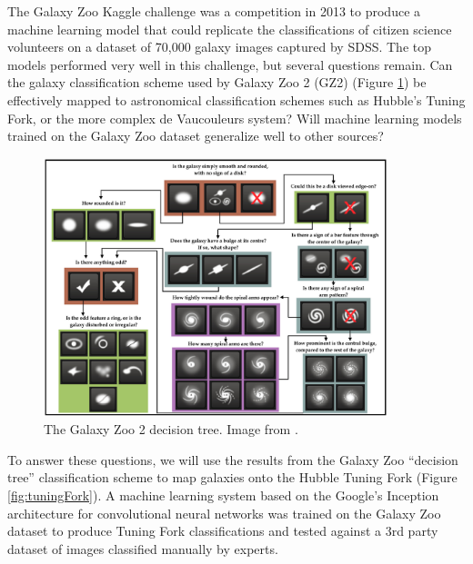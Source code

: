 \documentclass{article}
\begin{document}
The Galaxy Zoo Kaggle challenge was a competition in 2013 to produce a machine learning model that could replicate the classifications of citizen science volunteers on a dataset of 70,000 galaxy images captured by SDSS. The top models performed very well in this challenge, but several questions remain. Can the galaxy classification scheme used by Galaxy Zoo 2 (GZ2) (Figure \ref{fig:GZ2tree}) be effectively mapped to astronomical classification schemes such as Hubble's Tuning Fork, or the more complex de Vaucouleurs system? Will machine learning models trained on the Galaxy Zoo dataset generalize well to other sources? 


\begin{figure}[h]
  \centering
	\includegraphics[width=100mm]{../img/GZ2_tree.png}
  \caption{The Galaxy Zoo 2 decision tree. Image from \cite{2013MNRAS.435.2835W}.}
  \label{fig:GZ2tree}
\end{figure}

To answer these questions, we will use the results from the Galaxy Zoo “decision tree” classification scheme to map galaxies onto the Hubble Tuning Fork (Figure \ref{fig:tuningFork}). A machine learning system based on the Google’s Inception architecture for convolutional neural networks was trained on the Galaxy Zoo dataset to produce Tuning Fork classifications and tested against a 3rd party dataset of images classified manually by experts.
\end{document}

